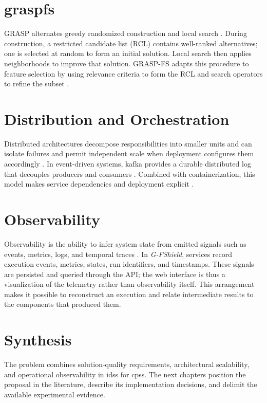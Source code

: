 \section{\ac{graspfs}}

GRASP alternates greedy randomized construction and local search \cite{ResendeRibeiro2010}. During construction, a restricted candidate list (RCL) contains well-ranked alternatives; one is selected at random to form an initial solution. Local search then applies neighborhoods to improve that solution. GRASP-FS adapts this procedure to feature selection by using relevance criteria to form the RCL and search operators to refine the subset \cite{quincozes2020grasp,quincozes2021performance,quincozes2022extended}.

\section{Distribution and Orchestration}

Distributed architectures decompose responsibilities into smaller units and can isolate failures and permit independent scale when deployment configures them accordingly \cite{Tanenbaum2007Distributed,Newman2021}. In event-driven systems, \ac{kafka} provides a durable distributed log that decouples producers and consumers \cite{Kreps2011}. Combined with containerization, this model makes service dependencies and deployment explicit \cite{Anderson2015Docker}.

\section{Observability}

Observability is the ability to infer system state from emitted signals such as events, metrics, logs, and temporal traces \cite{beyer2016site,usman2022observabilitysurvey}. In \textit{G-FShield}, services record execution events, metrics, states, run identifiers, and timestamps. These signals are persisted and queried through the API; the web interface is thus a visualization of the telemetry rather than observability itself. This arrangement makes it possible to reconstruct an execution and relate intermediate results to the components that produced them.

\section{Synthesis}

The problem combines solution-quality requirements, architectural scalability, and operational observability in \acp{ids} for \acp{cps}. The next chapters position the proposal in the literature, describe its implementation decisions, and delimit the available experimental evidence.
